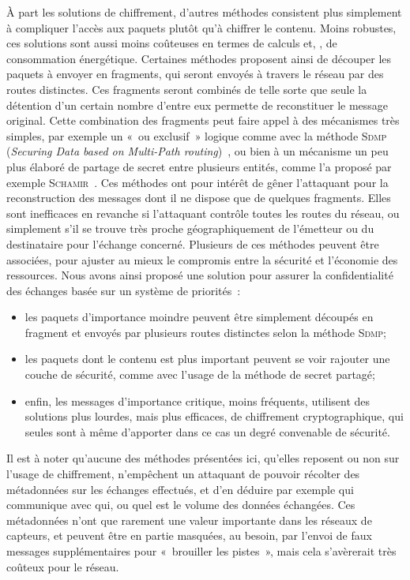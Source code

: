 À part les solutions de chiffrement, d'autres méthodes consistent plus simplement à compliquer l'accès aux paquets plutôt qu'à chiffrer le contenu.
Moins robustes, ces solutions sont aussi moins coûteuses en termes de calculs et, \infine, de consommation énergétique.
Certaines méthodes proposent ainsi de découper les paquets à envoyer en fragments, qui seront envoyés à travers le réseau par des routes distinctes.
Ces fragments seront combinés de telle sorte que seule la détention d'un certain nombre d'entre eux permette de reconstituer le message original.
Cette combination des fragments peut faire appel à des mécanismes très simples, par exemple un « ou exclusif » logique comme avec la méthode \textsc{Sdmp} (\textit{Securing Data based on Multi-Path routing})~\cite{BM10}, ou bien à un mécanisme un peu plus élaboré de partage de secret entre plusieurs entités, comme l'a proposé par exemple \textsc{Schamir}~\cite{Sha79}.
Ces méthodes ont pour intérêt de gêner l'attaquant pour la reconstruction des messages dont il ne dispose que de quelques fragments.
Elles sont inefficaces en revanche si l'attaquant contrôle toutes les routes du réseau, ou simplement s'il se trouve très proche géographiquement de l'émetteur ou du destinataire pour l'échange concerné.
Plusieurs de ces méthodes peuvent être associées, pour ajuster au mieux le compromis entre la sécurité et l'économie des ressources.
Nous avons ainsi proposé une solution pour assurer la confidentialité des échanges basée sur un système de priorités~\cite{MMB13}:
\begin{itemize}
    \item les paquets d'importance moindre peuvent être simplement découpés en fragment et envoyés par plusieurs routes distinctes selon la méthode \textsc{Sdmp};
    \item les paquets dont le contenu est plus important peuvent se voir rajouter une couche de sécurité, comme avec l'usage de la méthode de secret partagé;
    \item enfin, les messages d'importance critique, moins fréquents, utilisent des solutions plus lourdes, mais plus efficaces, de chiffrement cryptographique, qui seules sont à même d'apporter dans ce cas un degré convenable de sécurité.
\end{itemize}

Il est à noter qu'aucune des méthodes présentées ici, qu'elles reposent ou non sur l'usage de chiffrement, n'empêchent un attaquant de pouvoir récolter des métadonnées sur les échanges effectués, et d'en déduire par exemple qui communique avec qui, ou quel est le volume des données échangées.
Ces métadonnées n'ont que rarement une valeur importante dans les réseaux de capteurs, et peuvent être en partie masquées, au besoin, par l'envoi de faux messages supplémentaires pour « brouiller les pistes », mais cela s'avèrerait très coûteux pour le réseau.

